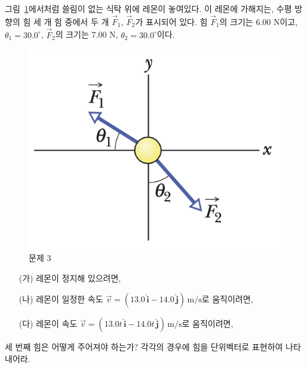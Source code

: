 \documentclass[floatfix,nofootinbib,superscriptaddress,fleqn,preprint]{revtex4}
\begin{document}
 그림~\ref{fig:3}에서처럼 쓸림이 없는 식탁 위에 레몬이 놓여있다. 이
 레몬에 가해지는, 수평 방향의 힘 세 개 힘 중에서  두 개 $\vec{F}_1$,
 $\vec{F}_2$가 표시되어 있다. 힘 $\vec{F}_1$의 크기는 6.00 N이고,
$\theta_1=30.0^\circ$, $\vec{F}_2$의 크기는 7.00 N,
$\theta_2=30.0^\circ$이다. 
\begin{figure}[ht]
  \centering
\includegraphics[scale=0.6]{Qfig6-3-20220316.png}  
  \caption{문제 3}
  \label{fig:3}
\end{figure}
\begin{itemize}
\item[(가)] 레몬이 정지해 있으려면,
\item[(나)] 레몬이 일정한 속도 $\vec{v} =(13.0\,\hat{\bm{i}} -
  14.0\,\hat{\bm{j}})\,\mathrm{m/s}$로 움직이려면, 
\item[(다)] 레몬이 속도 $\vec{v} =(13.0t\,\hat{\bm{i}} -
  14.0t\,\hat{\bm{j}})\,\mathrm{m/s}$로 움직이려면, 
\end{itemize}
세 번째 힘은 어떻게 주어져야 하는가? 각각의 경우에 힘을 단위벡터로
표현하여 나타내어라. \\ \\
\end{document}
